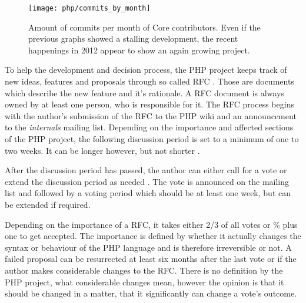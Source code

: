 \begin{figure}[htbp]
  \centering
  \texttt{[image: php/commits\_by\_month]}
  \caption[Commits by month, PHP]
  {Amount of commits per month of Core contributors. Even if the previous
    graphs showed a stalling development, the recent happenings in 2012 appear
    to show an again growing project.}
\end{figure}

To help the development and decision process, the PHP project keeps track of
new ideas, features and proposals through so called \ac{RFC} \cite{PHPRFC}.
Those are documents which describe the new feature and it's rationale. A
\ac{RFC} document is always owned by at least one person, who is responsible
for it. The \ac{RFC} process begins with the author's submission of the
\ac{RFC} to the PHP wiki and an announcement to the \emph{internals} mailing
list. Depending on the importance and affected sections of the PHP project, the
following discussion period is set to a minimum of one to two weeks. It can be
longer however, but not shorter \cite{PHPVoting}.

After the discussion period has passed, the author can either call for a vote
or extend the discussion period as needed \cite{PHPVoting}. The vote is
announced on the mailing list and followed by a voting period which should be
at least one week, but can be extended if required.

Depending on the importance of a \ac{RFC}, it takes either 2/3 of all votes or
\unit[50]{\%} plus one to get accepted. The importance is defined by whether it
actually changes the syntax or behaviour of the PHP language and is therefore
irreversible or not. A failed proposal can be resurrected at least six months
after the last vote or if the author makes considerable changes to the
\ac{RFC}. There is no definition by the PHP project, what considerable changes
mean, however the opinion is that it should be changed in a matter, that it
significantly can change a vote's outcome.

